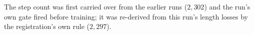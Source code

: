 The step count was first carried over from the earlier runs ($2{,}302$) and the run's own gate fired before training; it was re-derived from this run's length losses by the registration's own rule ($2{,}297$).
